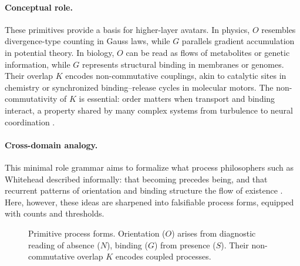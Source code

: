 \documentclass[12pt,a4paper,oneside]{scrreprt}
\begin{document}
\paragraph{Conceptual role.} 
These primitives provide a basis for higher-layer avatars. 
In physics, $O$ resembles divergence-type counting in Gauss laws, 
while $G$ parallels gradient accumulation in potential theory. 
In biology, $O$ can be read as flows of metabolites or genetic information, 
while $G$ represents structural binding in membranes or genomes. 
Their overlap $K$ encodes non-commutative couplings, akin to catalytic sites in chemistry 
or synchronized binding–release cycles in molecular motors. 
The non-commutativity of $K$ is essential: order matters when transport and binding interact, 
a property shared by many complex systems from turbulence to neural coordination \citep{Laughlin2000Emergent}.

\paragraph{Cross-domain analogy.} 
This minimal role grammar aims to formalize what process philosophers such as Whitehead described informally: 
that becoming precedes being, and that recurrent patterns of orientation and binding structure the flow of existence \citep{Whitehead1929Process}. 
Here, however, these ideas are sharpened into falsifiable process forms, equipped with counts and thresholds.

\begin{figure}[ht]
\centering
{}
\caption{Primitive process forms. Orientation ($O$) arises from diagnostic reading of absence ($N$), 
binding ($G$) from presence ($S$). Their non-commutative overlap $K$ encodes coupled processes.}
\label{fig:primitive-forms}
\end{figure}
\end{document}
